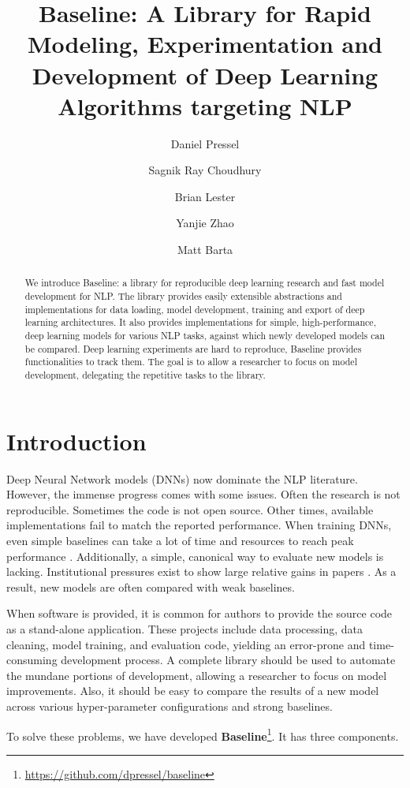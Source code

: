 \documentclass[11pt,a4paper]{article}
\title{Baseline: A Library for Rapid Modeling, Experimentation and Development of Deep Learning Algorithms targeting NLP}
\author[]{Daniel Pressel}
\author[]{Sagnik Ray Choudhury}
\author[]{Brian Lester}
\author[]{Yanjie Zhao}
\author[]{Matt Barta}
\affil[]{Interactions Digital Roots}
\affil[]{\{dpressel, schoudhury, blester, yzhao, mbarta\}@interactions.com}
\date{}
\begin{document}
\maketitle
\begin{abstract}
 We introduce Baseline: a library for reproducible deep learning research and fast model development for NLP. The library provides easily extensible abstractions and implementations for data loading, model development, training and export of deep learning architectures. It also provides implementations for simple, high-performance, deep learning models for various NLP tasks, against which newly developed models can be compared. Deep learning experiments are hard to reproduce, Baseline provides functionalities to track them. The goal is to allow a researcher to focus on model development, delegating the repetitive tasks to the library.
\end{abstract}


\section{Introduction}
\label{sec:intro}
 
Deep Neural Network models (DNNs) now dominate the NLP literature. However, the immense progress comes with some issues. Often the research is not reproducible. Sometimes the code is not open source. Other times, available implementations fail to match the reported performance. When training DNNs, even simple baselines can take a lot of time and resources to reach peak performance \cite{Melis2017OnTS:17}. Additionally, a simple, canonical way to evaluate new models is lacking. Institutional pressures exist to show large relative gains in papers \cite{Armstrong2009RelativeSI:09}. As a result, new models are often compared with weak baselines.

When software is provided, it is common for authors to provide the source code as a stand-alone application. These projects include data processing, data cleaning, model training, and evaluation code, yielding an error-prone and time-consuming development process. A complete library should be used to automate the mundane portions of development, allowing a researcher to focus on model improvements. Also, it should be easy to compare the results of a new model across various hyper-parameter configurations and strong baselines.

To solve these problems, we have developed \textbf{Baseline}\footnote{\url{https://github.com/dpressel/baseline}}. It has three components. 
\end{document}
